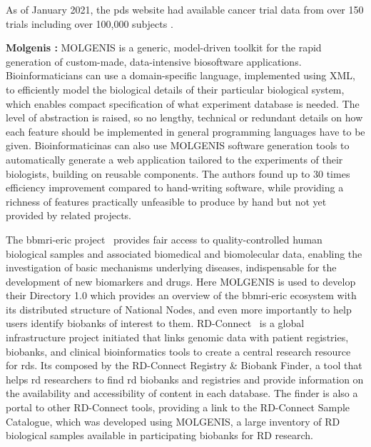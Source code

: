 As of January 2021, the \gls{pds} website had available cancer trial data from over 150
trials including over 100,000 subjects \cite{datasphere-site}.

\textbf{Molgenis \cite{molgenis}:}
MOLGENIS is a generic, model-driven toolkit for the rapid generation of custom-made,
data-intensive biosoftware applications.
Bioinformaticians can use a domain-specific language, implemented using XML, to
efficiently model the biological details of their particular biological system, which
enables compact specification of what experiment database is needed.
The level of abstraction is raised, so no lengthy, technical or redundant details on
how each feature should be implemented in general programming languages have to be
given.
Bioinformaticinas can also use MOLGENIS software generation tools to automatically
generate a web application tailored to the experiments of their biologists, building on
reusable components.
The authors found up to 30 times efficiency improvement compared to hand-writing
software, while providing a richness of features practically unfeasible to produce by
hand but not yet provided by related projects.

The \gls{bbmri-eric} project~\cite{bbmrieric} provides fair access to
quality-controlled human biological samples and associated biomedical and biomolecular
data, enabling the investigation of basic mechanisms underlying diseases, indispensable
for the development of new biomarkers and drugs.
Here MOLGENIS is used to develop their Directory 1.0 which provides an overview of the
\gls{bbmri-eric} ecosystem with its distributed structure of National Nodes, and even more
importantly to help users identify biobanks of interest to them.
RD-Connect~\cite{rdconnect} is a global infrastructure project initiated that links
genomic data with patient registries, biobanks, and clinical bioinformatics tools to
create a central research resource for \gls{rd}s.
Its composed by the RD-Connect Registry \& Biobank Finder, a tool that helps \gls{rd}
researchers to find \gls{rd} biobanks and registries and provide information on the
availability and accessibility of content in each database.
The finder is also a portal to other RD-Connect tools, providing a link to the
RD-Connect Sample Catalogue, which was developed using MOLGENIS, a large inventory of
RD biological samples available in participating biobanks for RD research. 



